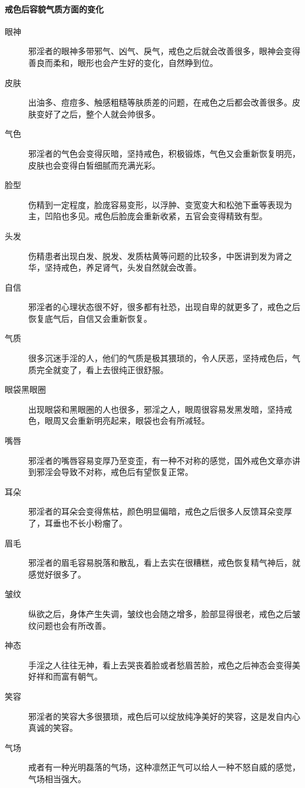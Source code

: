 \paragraph{戒色后容貌气质方面的变化}

\begin{multicols}{2}
    \begin{description}
        \item[眼神] 邪淫者的眼神多带邪气、凶气、戾气，戒色之后就会改善很多，眼神会变得善良而柔和，眼形也会产生好的变化，自然睁到位。
        \item[皮肤] 出油多、痘痘多、触感粗糙等肤质差的问题，在戒色之后都会改善很多。皮肤变好了之后，整个人就会帅很多。
        \item[气色] 邪淫者的气色会变得灰暗，坚持戒色，积极锻炼，气色又会重新恢复明亮，皮肤也会变得白皙细腻而充满光彩。
        \item[脸型] 伤精到一定程度，脸庞容易变形，以浮肿、变宽变大和松弛下垂等表现为主，凹陷也多见。戒色后脸庞会重新收紧，五官会变得精致有型。
        \item[头发] 伤精患者出现白发、脱发、发质枯黄等问题的比较多，中医讲到发为肾之华，坚持戒色，养足肾气，头发自然就会改善。
        \item[自信] 邪淫者的心理状态很不好，很多都有社恐，出现自卑的就更多了，戒色之后恢复底气后，自信又会重新恢复。
        \item[气质] 很多沉迷手淫的人，他们的气质是极其猥琐的，令人厌恶，坚持戒色后，气质完全就变了，看上去很纯正很舒服。
        \item[眼袋黑眼圈] 出现眼袋和黑眼圈的人也很多，邪淫之人，眼周很容易发黑发暗，坚持戒色，眼周又会重新明亮起来，眼袋也会有所减轻。
        \item[嘴唇] 邪淫者的嘴唇容易变厚乃至变歪，有一种不对称的感觉，国外戒色文章亦讲到邪淫会导致不对称，戒色后有望恢复正常。
        \item[耳朵] 邪淫者的耳朵会变得焦枯，颜色明显偏暗，戒色之后很多人反馈耳朵变厚了，耳垂也不长小粉瘤了。
        \item[眉毛] 邪淫者的眉毛容易脱落和散乱，看上去实在很糟糕，戒色恢复精气神后，就感觉好很多了。
        \item[皱纹] 纵欲之后，身体产生失调，皱纹也会随之增多，脸部显得很老，戒色之后皱纹问题也会有所改善。
        \item[神态] 手淫之人往往无神，看上去哭丧着脸或者愁眉苦脸，戒色之后神态会变得美好祥和而富有朝气。
        \item[笑容] 邪淫者的笑容大多很猥琐，戒色后可以绽放纯净美好的笑容，这是发自内心真诚的笑容。
        \item[气场] 戒者有一种光明磊落的气场，这种凛然正气可以给人一种不怒自威的感觉，气场相当强大。

\end{description}
\end{multicols}
